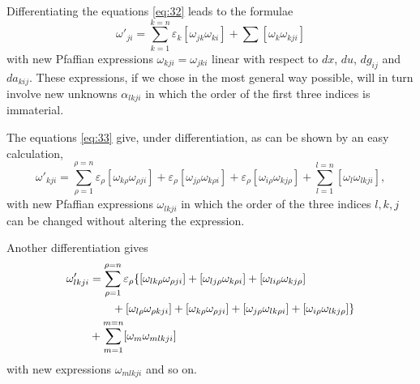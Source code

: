 \documentclass[leqno,12pt]{article}
\makeatletter
\let\old@epsilon\epsilon
\let\old@varepsilon\varepsilon
\let\epsilon\old@varepsilon
\let\varepsilon\old@epsilon
\theoremstyle{shape1}
\theoremstyle{shape0}
\theoremstyle{shape2}
\theoremstyle{definition}
\makeatother
\begin{document}
Differentiating the equations \eqref{eq:32} leads to the formulae
\begin{equation}
  \label{eq:33}
  \omega'_{ji}=\sum_{k=1}^{k=n}\epsilon_{k}[\omega_{jk}\omega_{ki}]+\sum[\omega_{k}\omega_{kji}]
\end{equation}
with new Pfaffian expressions $\omega_{kji}=\omega_{jki}$ linear with respect to $dx$, $du$, $dg_{ij}$ and $da_{kij}$. These expressions, if we chose in the most general way possible, will in turn involve new unknowns $\alpha_{lkji}$ in which the order of the first three indices is immaterial.

The equations \eqref{eq:33} give, under differentiation, as can be shown by an easy calculation,
\begin{equation}
  \label{eq:34}
  \omega'_{kji}=\sum_{\rho=1}^{\rho=n}\epsilon_{\rho}[\omega_{k\rho}\omega_{\rho ji}]+\epsilon_{\rho}[\omega_{j\rho}\omega_{k\rho i}]+\epsilon_{\rho}[\omega_{i\rho}\omega_{kj\rho}]+\sum_{l=1}^{l=n}[\omega_{l}\omega_{lkji}],
\end{equation}
with new Pfaffian expressions $\omega_{lkji}$ in which the order of the three indices $l,k,j$ can be changed without altering the expression.

Another differentiation gives
\begin{align}
  \label{eq:35}
  \omega'_{lkji}&=\sum_{\rho=1}^{\rho=n}\epsilon_{\rho}\{[\omega_{lk\rho}\omega_{\rho ji}]+[\omega_{lj\rho}\omega_{k \rho i}]+[\omega_{li\rho}\omega_{kj\rho}]\\
  &\qquad +[\omega_{l\rho}\omega_{\rho kji}]+[\omega_{k\rho}\omega_{\rho ji}]+[\omega_{j\rho}\omega_{lk\rho i}]+[\omega_{i\rho}\omega_{lkj\rho}]\}\notag\\
  &+\sum_{m=1}^{m=n}[\omega_{m}\omega_{mlkji}]\notag
\end{align}
with new expressions $\omega_{mlkji}$ and so on.
\end{document}
